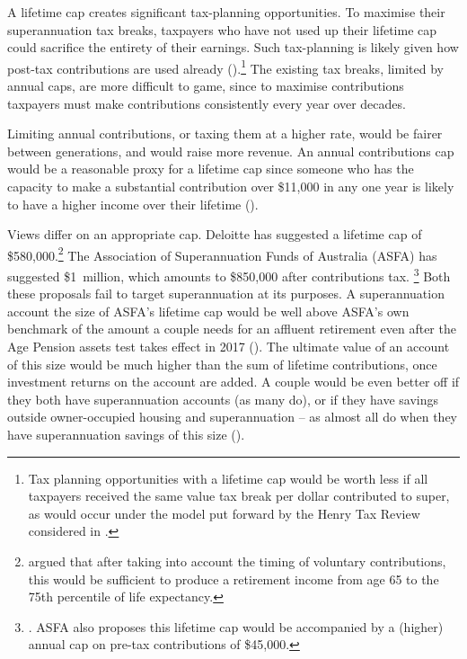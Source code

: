 A lifetime cap creates significant tax-planning opportunities. To maximise their superannuation tax breaks, taxpayers who have not used up their lifetime cap could sacrifice the entirety of their earnings. Such tax-planning is likely given how post-tax contributions are used already ().\footnote{Tax planning opportunities with a lifetime cap would be worth less if all taxpayers received the same value tax break per dollar contributed to super, as would occur under the model put forward by the Henry Tax Review considered in .}  The existing tax breaks, limited by annual caps, are more difficult to game, since to maximise contributions taxpayers must make contributions consistently every year over decades.  

Limiting annual contributions, or taxing them at a higher rate, would be fairer between generations, and would raise more revenue. An annual contributions cap would be a reasonable proxy for a lifetime cap since someone who has the capacity to make a substantial contribution over \$11,000 in any one year is likely to have a higher income over their lifetime ().

Views differ on an appropriate cap. Deloitte has suggested a lifetime cap of \$580,000.\footnote{\textcite[][18]{Deloitte2015DynamicsofAusSuper} argued that after taking into account the timing of voluntary contributions, this would be sufficient to produce a retirement income from age 65 to the 75th percentile of life expectancy.} The Association of Superannuation Funds of Australia (ASFA) has suggested \$1~million, which amounts to \$850,000 after contributions tax.%
\footnote{\textcite[][39]{ASFA2015TreasurySubmission}. ASFA also proposes this lifetime cap would be accompanied by a (higher) annual cap on pre-tax contributions of \$45,000.}
Both these proposals fail to target superannuation at its purposes. A superannuation account the size of ASFA’s lifetime cap would be well above ASFA’s own benchmark of the amount a couple needs for an affluent retirement even after the Age Pension assets test takes effect in 2017 (). The ultimate value of an account of this size would be much higher than the sum of lifetime contributions, once investment returns on the account are added. A couple would be even better off if they both have superannuation accounts (as many do), or if they have savings outside owner-occupied housing and superannuation – as almost all do when they have superannuation savings of this size (). 

